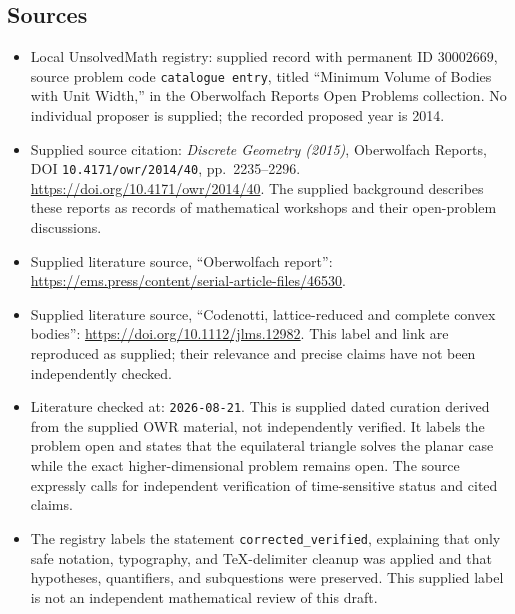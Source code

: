 \documentclass[11pt]{article}
\begin{document}
\subsection{Sources}
\begin{itemize}
\item Local UnsolvedMath registry: supplied record with permanent ID \(30002669\), source problem code \texttt{catalogue entry}, titled ``Minimum Volume of Bodies with Unit Width,'' in the Oberwolfach Reports Open Problems collection. No individual proposer is supplied; the recorded proposed year is 2014.
\item Supplied source citation: \emph{Discrete Geometry (2015)}, Oberwolfach Reports, DOI \texttt{10.4171/owr/2014/40}, pp.~2235--2296. \url{https://doi.org/10.4171/owr/2014/40}. The supplied background describes these reports as records of mathematical workshops and their open-problem discussions.
\item Supplied literature source, ``Oberwolfach report'': \url{https://ems.press/content/serial-article-files/46530}.
\item Supplied literature source, ``Codenotti, lattice-reduced and complete convex bodies'': \url{https://doi.org/10.1112/jlms.12982}. This label and link are reproduced as supplied; their relevance and precise claims have not been independently checked.
\item Literature checked at: \texttt{2026-08-21}. This is supplied dated curation derived from the supplied OWR material, not independently verified. It labels the problem open and states that the equilateral triangle solves the planar case while the exact higher-dimensional problem remains open. The source expressly calls for independent verification of time-sensitive status and cited claims.
\item The registry labels the statement \texttt{corrected\_verified}, explaining that only safe notation, typography, and TeX-delimiter cleanup was applied and that hypotheses, quantifiers, and subquestions were preserved. This supplied label is not an independent mathematical review of this draft.
\end{itemize}
\end{document}
